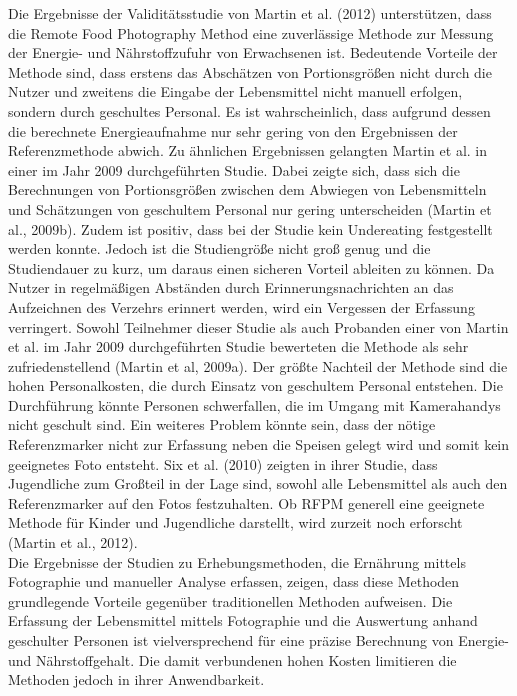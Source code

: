 Die Ergebnisse der Validitätsstudie von Martin et al. (2012) unterstützen, dass die Remote Food Photography Method eine zuverlässige Methode zur Messung der Energie- und Nährstoffzufuhr von Erwachsenen ist. Bedeutende Vorteile der Methode sind, dass erstens das Abschätzen von Portionsgrößen nicht durch die Nutzer und zweitens die Eingabe der Lebensmittel nicht manuell erfolgen, sondern durch geschultes Personal. Es ist wahrscheinlich, dass aufgrund dessen die berechnete Energieaufnahme nur sehr gering von den Ergebnissen der Referenzmethode abwich. Zu ähnlichen Ergebnissen gelangten Martin et al. in einer im Jahr 2009 durchgeführten Studie. Dabei zeigte sich, dass sich die Berechnungen von Portionsgrößen zwischen dem Abwiegen von Lebensmitteln und Schätzungen von geschultem Personal nur gering unterscheiden (Martin et al., 2009b). Zudem ist positiv, dass bei der Studie kein Undereating festgestellt werden konnte. Jedoch ist die Studiengröße nicht groß genug und die Studiendauer zu kurz, um daraus einen sicheren Vorteil ableiten zu können. Da Nutzer in regelmäßigen Abständen durch Erinnerungsnachrichten an das Aufzeichnen des Verzehrs erinnert werden, wird ein Vergessen der Erfassung verringert. Sowohl Teilnehmer dieser Studie als auch Probanden einer von Martin et al. im Jahr 2009 durchgeführten Studie bewerteten die Methode als sehr zufriedenstellend (Martin et al, 2009a). Der größte Nachteil der Methode sind die hohen Personalkosten, die durch Einsatz von geschultem Personal entstehen. Die Durchführung könnte Personen schwerfallen, die im Umgang mit Kamerahandys nicht geschult sind. Ein weiteres Problem könnte sein, dass der nötige Referenzmarker nicht zur Erfassung neben die Speisen gelegt wird und somit kein geeignetes Foto entsteht. Six et al. (2010) zeigten in ihrer Studie, dass Jugendliche zum Großteil in der Lage sind, sowohl alle Lebensmittel als auch den Referenzmarker auf den Fotos festzuhalten. Ob RFPM generell eine geeignete Methode für Kinder und Jugendliche darstellt, wird zurzeit noch erforscht (Martin et al., 2012). \\
Die Ergebnisse der Studien zu Erhebungsmethoden, die Ernährung mittels Fotographie und manueller Analyse erfassen, zeigen, dass diese Methoden grundlegende Vorteile gegenüber traditionellen Methoden aufweisen. Die Erfassung der Lebensmittel mittels Fotographie und die Auswertung anhand geschulter Personen ist vielversprechend für eine präzise Berechnung von Energie- und Nährstoffgehalt. Die damit verbundenen hohen Kosten limitieren die Methoden jedoch in ihrer Anwendbarkeit. 

